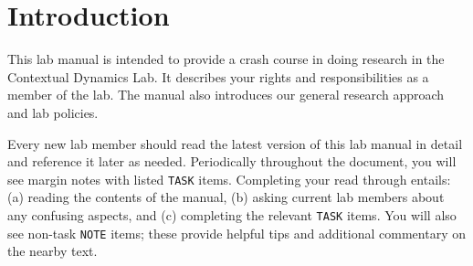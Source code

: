 \documentclass{tufte-book} %
\begin{document}






\newcommand{\director}{Jeremy}
\newcommand{\coordinator}{Paxton}
\newcommand{\labmeetingtime}{Wednesdays at 12:30pm}

\cleardoublepage
\chapter{Introduction}\label{ch:intro} %
This lab manual is intended to provide a crash course in doing
research in the Contextual Dynamics Lab.  It describes your rights and
responsibilities as a member of the lab.  The manual also introduces
our general research approach and lab policies.


\noindent {}
Every new lab member should read
the latest version of this lab manual in detail and reference it later
as needed.  Periodically throughout the document, you will see margin
notes with listed \texttt{TASK} items.  Completing your read through
entails: (a) reading the contents of the manual, (b) asking current
lab members about any confusing aspects, and (c) completing the
relevant \texttt{TASK} items.  You will also see non-task
\texttt{NOTE} items; these provide helpful tips and additional
commentary on the nearby text.
\end{document}
